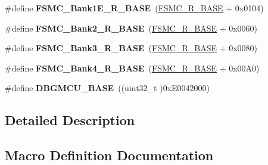 \begin{DoxyCompactItemize}
\item 
\#define {\bfseries F\+S\+M\+C\+\_\+\+Bank1\+E\+\_\+\+R\+\_\+\+B\+A\+SE}~(\hyperlink{group___peripheral__memory__map_gaddf0e199dccba83272b20c9fb4d3aaed}{F\+S\+M\+C\+\_\+\+R\+\_\+\+B\+A\+SE} + 0x0104)\hypertarget{group___peripheral__memory__map_gaea182589c84aee30b7f735474d8774e2}{}\label{group___peripheral__memory__map_gaea182589c84aee30b7f735474d8774e2}

\item 
\#define {\bfseries F\+S\+M\+C\+\_\+\+Bank2\+\_\+\+R\+\_\+\+B\+A\+SE}~(\hyperlink{group___peripheral__memory__map_gaddf0e199dccba83272b20c9fb4d3aaed}{F\+S\+M\+C\+\_\+\+R\+\_\+\+B\+A\+SE} + 0x0060)\hypertarget{group___peripheral__memory__map_ga3cb46d62f4f6458e186a5a4c753e4918}{}\label{group___peripheral__memory__map_ga3cb46d62f4f6458e186a5a4c753e4918}

\item 
\#define {\bfseries F\+S\+M\+C\+\_\+\+Bank3\+\_\+\+R\+\_\+\+B\+A\+SE}~(\hyperlink{group___peripheral__memory__map_gaddf0e199dccba83272b20c9fb4d3aaed}{F\+S\+M\+C\+\_\+\+R\+\_\+\+B\+A\+SE} + 0x0080)\hypertarget{group___peripheral__memory__map_gacf056152c9e5aefcc67db78d1302c0d7}{}\label{group___peripheral__memory__map_gacf056152c9e5aefcc67db78d1302c0d7}

\item 
\#define {\bfseries F\+S\+M\+C\+\_\+\+Bank4\+\_\+\+R\+\_\+\+B\+A\+SE}~(\hyperlink{group___peripheral__memory__map_gaddf0e199dccba83272b20c9fb4d3aaed}{F\+S\+M\+C\+\_\+\+R\+\_\+\+B\+A\+SE} + 0x00\+A0)\hypertarget{group___peripheral__memory__map_gaf9e5417133160b0bdd0498d982acec19}{}\label{group___peripheral__memory__map_gaf9e5417133160b0bdd0498d982acec19}

\item 
\#define {\bfseries D\+B\+G\+M\+C\+U\+\_\+\+B\+A\+SE}~((uint32\+\_\+t )0x\+E0042000)\hypertarget{group___peripheral__memory__map_ga4adaf4fd82ccc3a538f1f27a70cdbbef}{}\label{group___peripheral__memory__map_ga4adaf4fd82ccc3a538f1f27a70cdbbef}

\end{DoxyCompactItemize}


\subsection{Detailed Description}


\subsection{Macro Definition Documentation}
